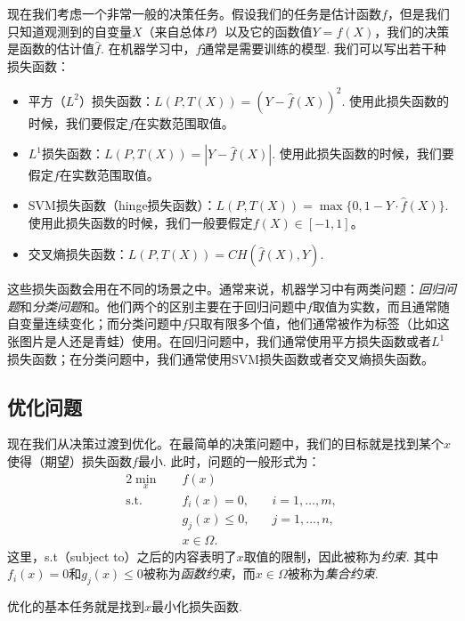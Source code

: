 现在我们考虑一个非常一般的决策任务。假设我们的任务是估计函数$f$，但是我们只知道观测到的自变量$X$（来自总体$P$）以及它的函数值$Y=f(X)$，我们的决策是函数的估计值$\hat f$. 在机器学习中，$f$通常是需要训练的模型. 我们可以写出若干种损失函数：
\begin{itemize}
    \item 平方（$L^2$）损失函数：$L(P,T(X))=(Y-\hat f(X))^2$. 使用此损失函数的时候，我们要假定$f$在实数范围取值。
    \item $L^1$损失函数：$L(P,T(X))=|Y-\hat f(X)|$. 使用此损失函数的时候，我们要假定$f$在实数范围取值。
    \item SVM损失函数（hinge损失函数）：$L(P,T(X))=\max\{0,1-Y\cdot\hat f(X)\}$. 使用此损失函数的时候，我们一般要假定$f(X)\in[-1,1]$。
    \item 交叉熵损失函数：$L(P,T(X))=CH(\hat f(X),Y)$.
\end{itemize}

这些损失函数会用在不同的场景之中。通常来说，机器学习中有两类问题：\emph{回归问题}和\emph{分类问题}和。他们两个的区别主要在于回归问题中$f$取值为实数，而且通常随自变量连续变化；而分类问题中$f$只取有限多个值，他们通常被作为标签（比如这张图片是人还是青蛙）使用。在回归问题中，我们通常使用平方损失函数或者$L^1$损失函数；在分类问题中，我们通常使用SVM损失函数或者交叉熵损失函数。

\subsection{优化问题}
现在我们从决策过渡到优化。在最简单的决策问题中，我们的目标就是找到某个$x$使得（期望）损失函数$f$最小. 此时，问题的一般形式为：
\begin{alignat*}{2}
\min_{x}&\quad f(x)\\
\text{s.t.}&\quad f_i(x)=0,&\quad i=1,\dots,m,\\
&\quad g_j(x)\leq 0,&\quad j=1,\dots,n,\\
&\quad x\in\Omega.
\end{alignat*}
这里，s.t（subject to）之后的内容表明了$x$取值的限制，因此被称为\emph{约束}. 其中$f_i(x)=0$和$g_j(x)\leq 0$被称为\emph{函数约束}，而$x\in\Omega$被称为\emph{集合约束}.

优化的基本任务就是找到$x$最小化损失函数. 

